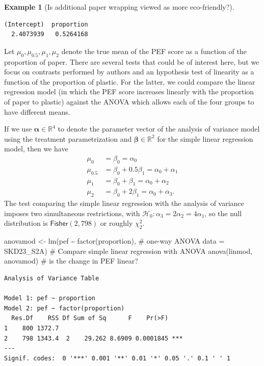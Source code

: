 \documentclass[
  11pt,
  letterpaper,
]{scrbook}
\newenvironment{Shaded}{\begin{snugshade}}{\end{snugshade}}
\newcommand{\AttributeTok}[1]{\textcolor[rgb]{0.40,0.45,0.13}{#1}}
\newcommand{\CommentTok}[1]{\textcolor[rgb]{0.37,0.37,0.37}{#1}}
\newcommand{\FunctionTok}[1]{\textcolor[rgb]{0.28,0.35,0.67}{#1}}
\newcommand{\NormalTok}[1]{\textcolor[rgb]{0.00,0.23,0.31}{#1}}
\newcommand{\OtherTok}[1]{\textcolor[rgb]{0.00,0.23,0.31}{#1}}
\newcommand{\SpecialCharTok}[1]{\textcolor[rgb]{0.37,0.37,0.37}{#1}}
\theoremstyle{definition}
\newtheorem{example}{Example}[chapter]
\theoremstyle{definition}
\theoremstyle{remark}
\begin{document}
\begin{example}[Is additional paper wrapping viewed as more
eco-friendly?]
\begin{verbatim}
(Intercept)  proportion 
  2.4073939   0.5264168 
\end{verbatim}

Let \(\mu_{0}, \mu_{0.5}, \mu_{1}, \mu_2\) denote the true mean of the
PEF score as a function of the proportion of paper. There are several
tests that could be of interest here, but we focus on contrasts
performed by authors and an hypothesis test of linearity as a function
of the proportion of plastic. For the latter, we could compare the
linear regression model (in which the PEF score increases linearly with
the proportion of paper to plastic) against the ANOVA which allows each
of the four groups to have different means.

If we use \(\boldsymbol{\alpha} \in \mathbb{R}^4\) to denote the
parameter vector of the analysis of variance model using the treatment
parametrization and \(\boldsymbol{\beta} \in \mathbb{R}^2\) for the
simple linear regression model, then we have \begin{align*}
\mu_0 &= \beta_0=\alpha_0 \\
\mu_{0.5} &= \beta_0 + 0.5 \beta_1 = \alpha_0 + \alpha_1\\
\mu_1 &= \beta_0 + \beta_1 = \alpha_0 + \alpha_2 \\
\mu_2 &= \beta_0 + 2 \beta_1= \alpha_0 + \alpha_3.
\end{align*} The test comparing the simple linear regression with the
analysis of variance imposes two simultaneous restrictions, with
\(\mathscr{H}_0: \alpha_3 = 2\alpha_2= 4\alpha_1\), so the null
distribution is \(\mathsf{Fisher}(2, 798)\) or roughly \(\chi^2_2\).

\begin{Shaded}
\begin{Highlighting}[]
\NormalTok{anovamod }\OtherTok{\textless{}{-}} \FunctionTok{lm}\NormalTok{(pef }\SpecialCharTok{\textasciitilde{}} \FunctionTok{factor}\NormalTok{(proportion), }\CommentTok{\# one{-}way ANOVA}
               \AttributeTok{data =}\NormalTok{ SKD23\_S2A) }
\CommentTok{\# Compare simple linear regression with ANOVA}
\FunctionTok{anova}\NormalTok{(linmod, anovamod) }\CommentTok{\# is the change in PEF linear?}
\end{Highlighting}
\end{Shaded}

\begin{verbatim}
Analysis of Variance Table

Model 1: pef ~ proportion
Model 2: pef ~ factor(proportion)
  Res.Df    RSS Df Sum of Sq      F    Pr(>F)    
1    800 1372.7                                  
2    798 1343.4  2    29.262 8.6909 0.0001845 ***
---
Signif. codes:  0 '***' 0.001 '**' 0.01 '*' 0.05 '.' 0.1 ' ' 1
\end{verbatim}


\end{example}
\end{document}
